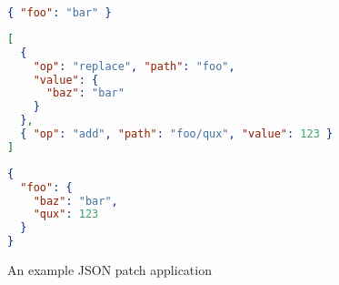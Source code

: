 \label{appendix:JSONpatch}

\begin{figure}[h]
\begin{lstlisting}[language=json,caption=Initial JSON document]
{ "foo": "bar" }
\end{lstlisting}

\begin{lstlisting}[language=json,caption=JSON patch]
[
  { 
    "op": "replace", "path": "foo",
    "value": {
      "baz": "bar"
    }
  },
  { "op": "add", "path": "foo/qux", "value": 123 }
]
\end{lstlisting}

\begin{lstlisting}[language=json,caption=Resulting JSON document]
{
  "foo": {
    "baz": "bar",
    "qux": 123
  }
}
\end{lstlisting}

\caption{An example JSON patch application}
\label{fig:jsonpatch}
\end{figure}